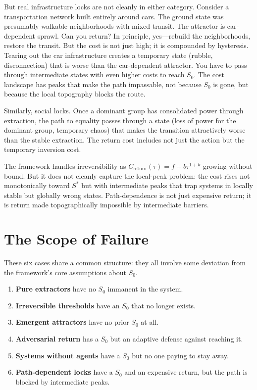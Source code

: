 \documentclass[12pt]{article}
\begin{document}
But real infrastructure locks are not cleanly in either category. Consider a transportation network built entirely around cars. The ground state was presumably walkable neighborhoods with mixed transit. The attractor is car-dependent sprawl. Can you return? In principle, yes—rebuild the neighborhoods, restore the transit. But the cost is not just high; it is compounded by hysteresis. Tearing out the car infrastructure creates a temporary state (rubble, disconnection) that is worse than the car-dependent attractor. You have to pass through intermediate states with even higher costs to reach $S_0$. The cost landscape has peaks that make the path impassable, not because $S_0$ is gone, but because the local topography blocks the route.

Similarly, social locks. Once a dominant group has consolidated power through extraction, the path to equality passes through a state (loss of power for the dominant group, temporary chaos) that makes the transition attractively worse than the stable extraction. The return cost includes not just the action but the temporary inversion cost.

The framework handles irreversibility as $C_{\text{return}}(\tau) = f + b\tau^{1+k}$ growing without bound. But it does not cleanly capture the local-peak problem: the cost rises not monotonically toward $S^*$ but with intermediate peaks that trap systems in locally stable but globally wrong states. Path-dependence is not just expensive return; it is return made topographically impossible by intermediate barriers.

\section{The Scope of Failure}

These six cases share a common structure: they all involve some deviation from the framework's core assumptions about $S_0$.

\begin{enumerate}
\item \textbf{Pure extractors} have no $S_0$ immanent in the system.
\item \textbf{Irreversible thresholds} have an $S_0$ that no longer exists.
\item \textbf{Emergent attractors} have no prior $S_0$ at all.
\item \textbf{Adversarial return} has a $S_0$ but an adaptive defense against reaching it.
\item \textbf{Systems without agents} have a $S_0$ but no one paying to stay away.
\item \textbf{Path-dependent locks} have a $S_0$ and an expensive return, but the path is blocked by intermediate peaks.
\end{enumerate}
\end{document}
